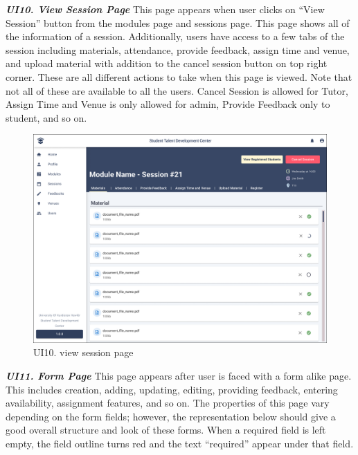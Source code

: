 \begin{justify}
    \noindent\textbf{\textit{UI10. View Session Page}}\newendline
    This page appears when user clicks on “View Session” button from the modules page and sessions page. This page shows all of the information of a session. Additionally, users have access to a few tabs of the session including materials, attendance, provide feedback, assign time and venue, and upload material with addition to the cancel session button on top right corner. These are all different actions to take when this page is viewed. Note that not all of these are available to all the users. Cancel Session is allowed for Tutor, Assign Time and Venue is only allowed for admin, Provide Feedback only to student, and so on.\\
    \begin{figure}[H]
    \centerline{\includegraphics[width=150mm,scale=1]{figures/analysis_and_design/design/UI/10. View Session Page (UI10).png}}
    \caption{UI10. view session page}
    \label{UI10}
    \end{figure}
    \clearpage

    \noindent\textbf{\textit{UI11. Form Page}}\newendline
    This page appears after user is faced with a form alike page. This includes creation, adding, updating, editing, providing feedback, entering availability, assignment features, and so on. The properties of this page vary depending on the form fields; however, the representation below should give a good overall structure and look of these forms. When a required field is left empty, the field outline turns red and the text “required” appear under that field.\\


\end{justify}
